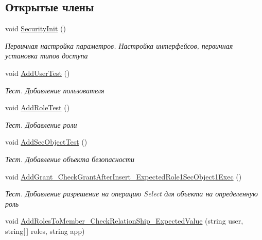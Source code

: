 \subsection*{Открытые члены}
\begin{DoxyCompactItemize}
\item 
void \hyperlink{interface_security_1_1_interfaces_1_1_tests_1_1_i_security_work_unit_test_ad4c83a70952c1dfcdc15c1dc29b223a2}{Security\+Init} ()
\begin{DoxyCompactList}\small\item\em Первичная настройка параметров. Настройка интерфейсов, первичная установка типов доступа \end{DoxyCompactList}\item 
void \hyperlink{interface_security_1_1_interfaces_1_1_tests_1_1_i_security_work_unit_test_a969a286db947dd1c12577403eabfd259}{Add\+User\+Test} ()
\begin{DoxyCompactList}\small\item\em Тест. Добавление пользователя \end{DoxyCompactList}\item 
void \hyperlink{interface_security_1_1_interfaces_1_1_tests_1_1_i_security_work_unit_test_a1adebc2d3ec0cb84ea2bf16dd50cb05e}{Add\+Role\+Test} ()
\begin{DoxyCompactList}\small\item\em Тест. Добавление роли \end{DoxyCompactList}\item 
void \hyperlink{interface_security_1_1_interfaces_1_1_tests_1_1_i_security_work_unit_test_a9cf0137f31de6fef0db41c649eed7b28}{Add\+Sec\+Object\+Test} ()
\begin{DoxyCompactList}\small\item\em Тест. Добавление объекта безопасности \end{DoxyCompactList}\item 
void \hyperlink{interface_security_1_1_interfaces_1_1_tests_1_1_i_security_work_unit_test_ad506dc9374c2f0f3c0a22e87b69aca5d}{Add\+Grant\+\_\+\+Check\+Grant\+After\+Insert\+\_\+\+Expected\+Role1\+Sec\+Object1\+Exec} ()
\begin{DoxyCompactList}\small\item\em Тест. Добавление разрешение на операцию Select для объекта на определенную роль \end{DoxyCompactList}\item 
void \hyperlink{interface_security_1_1_interfaces_1_1_tests_1_1_i_security_work_unit_test_a8b688153cfd3d37c56eb5e6dc888e36d}{Add\+Roles\+To\+Member\+\_\+\+Check\+Relation\+Ship\+\_\+\+Expected\+Value} (string user, string\mbox{[}$\,$\mbox{]} roles, string app)

\end{DoxyCompactItemize}
